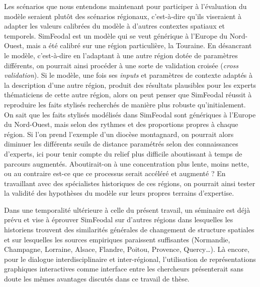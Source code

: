 \noindent Les scénarios que nous entendons maintenant pour participer à l'évaluation du modèle seraient plutôt des scénarios régionaux, c'est-à-dire qu'ils viseraient à adapter les valeurs calibrées du modèle à d'autres contextes spatiaux et temporels.
SimFeodal est un modèle qui se veut générique à l'Europe du Nord-Ouest, mais a été calibré sur une région particulière, la Touraine.
En désancrant le modèle, c'est-à-dire en l'adaptant à une autre région dotée de paramètres différents, on pourrait ainsi procéder à une sorte de validation croisée (\textit{cross validation}).
Si le modèle, une fois ses \textit{inputs} et paramètres de contexte adaptés à la description d'une autre région, produit des résultats plausibles pour les experts thématiciens de cette autre région, alors on peut penser que SimFeodal réussit à reproduire les faits stylisés recherchés de manière plus robuste qu'initialement.
On sait que les faits stylisés modélisés dans SimFeodal sont génériques à l'Europe du Nord-Ouest, mais selon des rythmes et des proportions propres à chaque région.
Si l'on prend l'exemple d'un diocèse montagnard, on pourrait alors diminuer les différents seuils de distance paramétrés selon des connaissances d'experts, ici pour tenir compte du relief plus difficile aboutissant à temps de parcours augmentés.
Aboutirait-on à une concentration plus lente, moins nette, ou au contraire est-ce que ce processus serait accéléré et augmenté ?
En travaillant avec des spécialistes historiques de ces régions, on pourrait ainsi tester la validité des hypothèses du modèle sur leurs propres terrains d'expertise.

Dans une temporalité ultérieure à celle du présent travail, un séminaire est déjà prévu et vise à éprouver SimFeodal sur d'autres régions dans lesquelles les historiens trouvent des similarités générales de changement de structure spatiales et sur lesquelles les sources empiriques paraissent suffisantes (Normandie, Champagne, Lorraine, Alsace, Flandre, Poitou, Provence, Quercy\ldots).
Là encore, pour le dialogue interdisciplinaire et inter-régional, l'utilisation de représentations graphiques interactives comme interface entre les chercheurs présenterait sans doute les mêmes avantages discutés dans ce travail de thèse.


